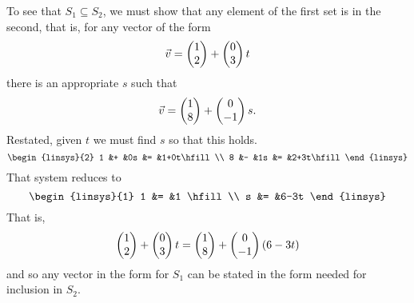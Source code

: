 \begin{exercises}
\begin{answer}
\begin{exparts}
        To see that \( S_1\subseteq S_2 \), we must show that any
        element of the
        first set is in the second, that is, for any vector of the form
        \begin{equation*}
          \vec{v}=\begin{pmatrix} 1 \\ 2 \end{pmatrix}
                  +\begin{pmatrix} 0 \\ 3 \end{pmatrix}t
        \end{equation*}
        there is an appropriate \( s \) such that
        \begin{equation*}
          \vec{v}=\begin{pmatrix} 1 \\ 8 \end{pmatrix}
                  +\begin{pmatrix} 0 \\ -1 \end{pmatrix}s.
        \end{equation*}
        Restated, given \( t \) we must find \( s \) so that this holds.
        \begin{equation*}
          \begin{linsys}{2}
            1  &+  &0s  &=  &1+0t\hfill  \\
            8  &-  &1s  &=  &2+3t\hfill  
          \end{linsys}
        \end{equation*}
        That system reduces to
        \begin{equation*}
          \begin{linsys}{1}
            1  &= &1 \hfill \\
            s  &= &6-3t
          \end{linsys}
        \end{equation*}
        That is,
        \begin{equation*}
          \begin{pmatrix} 1 \\ 2 \end{pmatrix}
          +\begin{pmatrix} 0 \\ 3 \end{pmatrix}t
          =\begin{pmatrix} 1 \\ 8 \end{pmatrix}
          +\begin{pmatrix} 0 \\ -1 \end{pmatrix}(6-3t)
        \end{equation*}
        and so any vector in the form for \( S_1 \) can be stated in the form
        needed for inclusion in \( S_2 \).


\end{exparts}
\end{answer}
\end{exercises}

